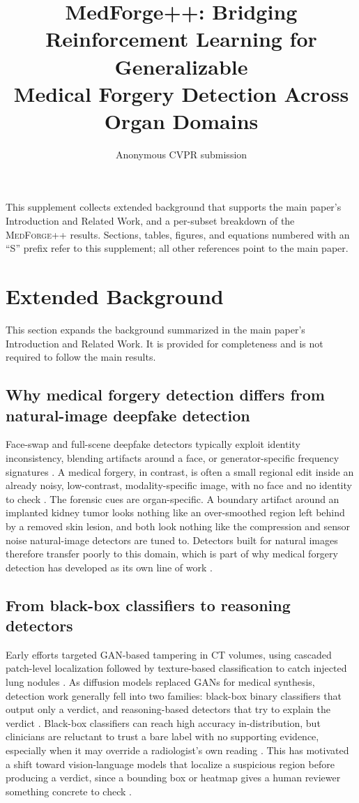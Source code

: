 \documentclass[10pt,twocolumn,letterpaper]{article}
\title{MedForge++: Bridging Reinforcement Learning for Generalizable\\Medical Forgery Detection Across Organ Domains}
\author{Anonymous CVPR submission}
\newcommand{\medforgepp}{\textsc{MedForge++}}
\begin{document}
\setcounter{page}{1}
\maketitlesupplementary

This supplement collects extended background that supports the main paper's Introduction and Related Work, and a per-subset breakdown of the \medforgepp{} results. Sections, tables, figures, and equations numbered with an ``S'' prefix refer to this supplement; all other references point to the main paper.

\section{Extended Background}

This section expands the background summarized in the main paper's Introduction and Related Work. It is provided for completeness and is not required to follow the main results.

\subsection{Why medical forgery detection differs from natural-image deepfake detection}
Face-swap and full-scene deepfake detectors typically exploit identity inconsistency, blending artifacts around a face, or generator-specific frequency signatures \cite{natural_deepfake_survey_2024, frequency_artifact_detection_2024}. A medical forgery, in contrast, is often a small regional edit inside an already noisy, low-contrast, modality-specific image, with no face and no identity to check \cite{medforge2026}. The forensic cues are organ-specific. A boundary artifact around an implanted kidney tumor looks nothing like an over-smoothed region left behind by a removed skin lesion, and both look nothing like the compression and sensor noise natural-image detectors are tuned to. Detectors built for natural images therefore transfer poorly to this domain, which is part of why medical forgery detection has developed as its own line of work \cite{biotampernet2026}.

\subsection{From black-box classifiers to reasoning detectors}
Early efforts targeted GAN-based tampering in CT volumes, using cascaded patch-level localization followed by texture-based classification to catch injected lung nodules \cite{ctgan2022}. As diffusion models replaced GANs for medical synthesis, detection work generally fell into two families: black-box binary classifiers that output only a verdict, and reasoning-based detectors that try to explain the verdict \cite{medical_forgery_survey_2023}. Black-box classifiers can reach high accuracy in-distribution, but clinicians are reluctant to trust a bare label with no supporting evidence, especially when it may override a radiologist's own reading \cite{explainable_medical_ai_2025, clinical_trust_ai_2024}. This has motivated a shift toward vision-language models that localize a suspicious region before producing a verdict, since a bounding box or heatmap gives a human reviewer something concrete to check \cite{medforge2026, vigil2026}.
\end{document}
